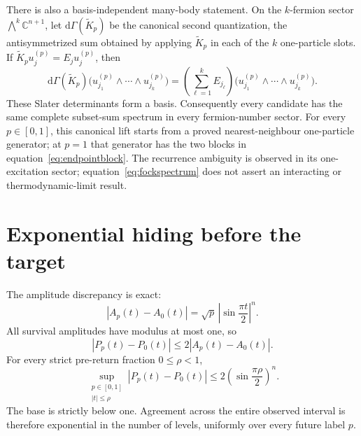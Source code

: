 \documentclass[12pt]{article}
\newcommand{\C}{\mathbb C}
\begin{document}
There is also a basis-independent many-body statement. On the
\(k\)-fermion sector \(\bigwedge^k\C^{n+1}\), let
\(\mathrm d\Gamma(\widetilde K_p)\) be the canonical second quantization,
the antisymmetrized sum obtained by applying \(\widetilde K_p\) in each of
the \(k\) one-particle slots. If
\(\widetilde K_p u_j^{(p)}=E_j u_j^{(p)}\), then
\begin{equation}
 \mathrm d\Gamma(\widetilde K_p)
 \bigl(u_{j_1}^{(p)}\wedge\cdots\wedge u_{j_k}^{(p)}\bigr)
 =
 \left(\sum_{\ell=1}^{k}E_{j_\ell}\right)
 \bigl(u_{j_1}^{(p)}\wedge\cdots\wedge u_{j_k}^{(p)}\bigr).
\label{eq:fockspectrum}
\end{equation}
These Slater determinants form a basis. Consequently every candidate has
the same complete subset-sum spectrum in every fermion-number sector. For
every \(p\in[0,1]\), this canonical lift starts from a proved
nearest-neighbour one-particle generator; at \(p=1\) that generator has the
two blocks in equation~\eqref{eq:endpointblock}. The recurrence ambiguity
is observed in its one-excitation sector; equation~\eqref{eq:fockspectrum}
does not assert an interacting or thermodynamic-limit result.

\section*{Exponential hiding before the target}

The amplitude discrepancy is exact:
\begin{equation}
 |A_p(t)-A_0(t)|
 =\sqrt p\,\left|\sin\frac{\pi t}{2}\right|^n .
\label{eq:exactdifference}
\end{equation}
All survival amplitudes have modulus at most one, so
\begin{equation}
 |P_p(t)-P_0(t)|
 \leq 2|A_p(t)-A_0(t)|.
\label{eq:probabilitybound}
\end{equation}
For every strict pre-return fraction \(0\leq\rho<1\),
\begin{equation}
 \sup_{\substack{p\in[0,1]\\ |t|\leq\rho}}
 |P_p(t)-P_0(t)|
 \leq
 2\left(\sin\frac{\pi\rho}{2}\right)^n.
\label{eq:window}
\end{equation}
The base is strictly below one. Agreement across the entire observed
interval is therefore exponential in the number of levels, uniformly over
every future label \(p\).
\end{document}
